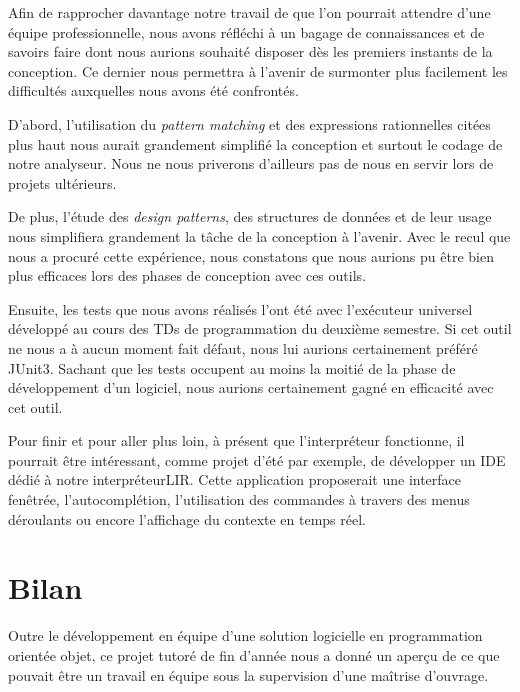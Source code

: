 \documentclass[12pt,a4paper,titlepage,openany, oneside]{report}
\begin{document}
        Afin de rapprocher davantage notre travail de que l'on pourrait attendre d'une
        équipe professionnelle, nous avons réfléchi à un bagage de connaissances et de
        savoirs faire dont nous aurions souhaité disposer dès les premiers instants de la
        conception. Ce dernier nous permettra à l'avenir de surmonter plus facilement
        les difficultés auxquelles nous avons été confrontés.

        D'abord, l'utilisation du \emph{pattern matching} et des expressions
        rationnelles citées plus haut nous aurait grandement simplifié la conception et
        surtout le codage de notre analyseur. Nous ne nous priverons d'ailleurs pas de
        nous en servir lors de projets ultérieurs.

        De plus, l'étude des \emph{design patterns}, des structures de données et de leur
        usage nous simplifiera grandement la tâche de la conception à l'avenir. Avec le
        recul que nous a procuré cette expérience, nous constatons que nous aurions
        pu être bien plus efficaces lors des phases de conception avec ces outils.

        Ensuite, les tests que nous avons réalisés l'ont été avec l'exécuteur universel
        développé au cours des TDs de programmation du deuxième semestre. Si cet outil
        ne nous a à aucun moment fait défaut, nous lui aurions certainement préféré JUnit3.
        Sachant que les tests occupent au moins la moitié de la phase de développement d'un
        logiciel, nous aurions certainement gagné en efficacité avec cet outil.

        Pour finir et pour aller plus loin, à présent que l'interpréteur fonctionne, il
        pourrait être intéressant, comme projet d'été par exemple, de développer un
        IDE dédié à notre interpréteurLIR. Cette application proposerait une interface
        fenêtrée, l'autocomplétion, l'utilisation des commandes à travers des
        menus déroulants ou encore l'affichage du contexte en temps réel.


    \chapter{Bilan}
        \large
        Outre le développement en équipe d'une solution logicielle en programmation
        orientée objet, ce projet tutoré de fin d'année nous a donné un aperçu de ce que
        pouvait être un travail en équipe sous la supervision d'une maîtrise d'ouvrage.
\end{document}
